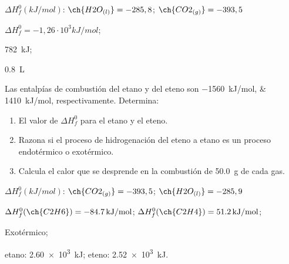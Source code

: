 \documentclass[10pt]{article}
\newenvironment{gexdatos}{
  \noindent\makebox[0pt][r]{\textit{Datos:}}
  }{\vspace{5pt}}
\begin{document}
\begin{multicols}{2}
\begin{exercise}[
    tags    = {},
    topics  = {química,química básica},
    source  = {FQ 1B MGH 2016, p85, e26},
  ]
  \begin{gexdatos}
    \( \Delta H^0_f (\si{kJ/mol}) \): \( \ch{H2O_{(l)}} = -285,8 \); \( \ch    {CO2_{(g)}} = -393,5 \)
  \end{gexdatos}

\end{exercise}

\begin{solution}
  \begin{enumerate*}
    \item \( \Delta H^0_f = -1,26·10^3 kJ/mol \);
    \item \SI{782}{kJ};
    \item \SI{0.8}{\liter}
  \end{enumerate*}
\end{solution}




\begin{exercise}[
    tags    = {},
    topics  = {química,química básica},
    source  = {FQ 1B MGH 2016, p85, e26},
  ]

  Las entalpías de combustión del etano y del eteno son
  \SIlist{-1560;1410}{kJ/mol}, respectivamente. Determina:
  \begin{enumerate}
    \item El valor de \( \Delta H^0_f \) para el etano y el eteno.
    \item Razona si el proceso de hidrogenación del eteno a etano
    es un proceso endotérmico o exotérmico.
    \item Calcula el calor que se desprende en la combustión de
    \SI{50.0}{\gram} de cada gas.
  \end{enumerate}

  \begin{gexdatos}
    \( \Delta H^0_f (\si{kJ/mol}) \): \( \ch{CO2_{(g)}} = -393,5 \); \( \ch{H2O_{(l)}} = -285,9 \)
  \end{gexdatos}

\end{exercise}

\begin{solution}
  \begin{enumerate*}
    \item \( \Delta H^0_f (\ch{C2H6})= \SI{-84,7}{kJ/mol} \); \( \Delta H^0_f (\ch{C2H4}) = \SI{51.2}{kJ/mol} \); \item Exotérmico; \item etano: \SI{2.60e3}{kJ}; eteno: \SI{2.52e3}{kJ}.
  \end{enumerate*}
\end{solution}





\end{multicols}
\end{document}
